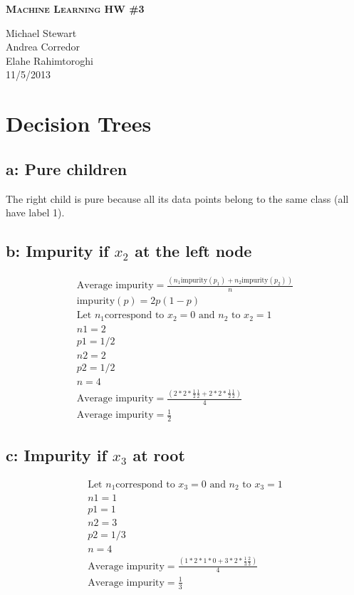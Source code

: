 \documentclass{article}
\newcommand{\header}[5]{
        \begin{minipage}[h!]{0.63\textwidth}
                \centering
                { \LARGE \textbf{ \textsc{#1} } }
        \end{minipage}
        \begin{minipage}[h!]{0.37\textwidth}
                \centering
                {#2}\\
                {#3}\\
        \end{minipage}
}
\begin{document}
\header{Machine Learning HW \#3}
       {Michael Stewart\\Andrea Corredor\\Elahe Rahimtoroghi}
       {11/5/2013}
\\\\


\section{Decision Trees}

\subsection*{a: Pure children}
The right child is pure because all its data points belong to the same class (all have label 1).

\subsection*{b: Impurity if $x_2$ at the left node}
\begin{align*}
\text{Average impurity} = \frac{\left( n_1 \text{impurity}(p_1) + n_2 \text{impurity}(p_2) \right)}{n} \\
\text{impurity}(p) = 2p(1-p) \\  
\text{Let } n_1 \text{correspond to } x_2 = 0 \text{ and } n_2 \text{ to } x_2 = 1 \\
n1 = 2 \\
p1 = 1/2 \\
n2 = 2 \\
p2 = 1/2 \\
n = 4 \\
\text{Average impurity} = \frac{\left( 2*2*\frac{1}{2}\frac{1}{2}  + 2*2* \frac{1}{2}\frac{1}{2} \right)}{4} \\
\text{Average impurity} = \frac{1}{2}
\end{align*}
\subsection*{c: Impurity if $x_3$ at root}
\begin{align*}
\text{Let } n_1 \text{correspond to } x_3 = 0 \text{ and } n_2 \text{ to } x_3 = 1 \\
n1 = 1 \\
p1 = 1 \\
n2 = 3 \\
p2 = 1/3 \\
n = 4 \\
\text{Average impurity} = \frac{\left( 1*2*1*0  + 3*2* \frac{1}{3}\frac{2}{3} \right)}{4} \\
\text{Average impurity} = \frac{1}{3}
\end{align*}
\end{document}

